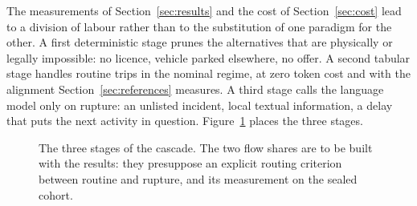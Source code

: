 The measurements of Section~\ref{sec:results} and the cost of Section~\ref{sec:cost} lead to a division of labour rather than to the substitution of one paradigm for the other. A first deterministic stage prunes the alternatives that are physically or legally impossible: no licence, vehicle parked elsewhere, no offer. A second tabular stage handles routine trips in the nominal regime, at zero token cost and with the alignment Section~\ref{sec:references} measures. A third stage calls the language model only on rupture: an unlisted incident, local textual information, a delay that puts the next activity in question. Figure~\ref{fig:cascade} places the three stages.

\begin{figure}[tbp]
  \centering
  \caption{The three stages of the cascade. The two flow shares are to be built with the results: they presuppose an explicit routing criterion between routine and rupture, and its measurement on the sealed cohort.}
  \label{fig:cascade}

\end{figure}
